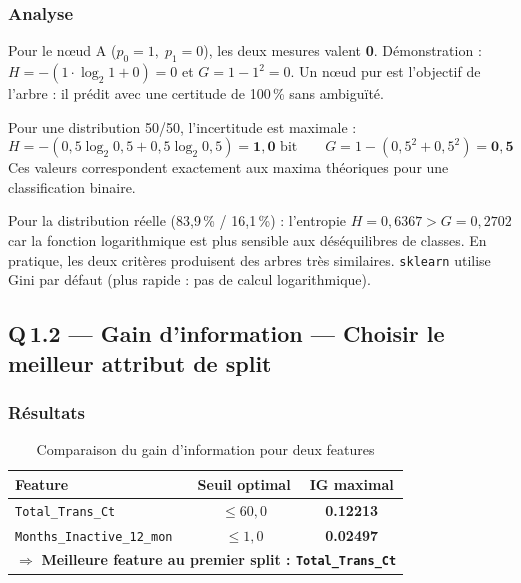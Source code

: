 \documentclass[12pt,a4paper]{article}
\newcommand{\feature}[1]{\texttt{\small #1}}
\newcommand{\score}[1]{\textbf{#1}}
\begin{document}
\subsubsection{Analyse}

\begin{reponsebox}
Pour le nœud A ($p_0=1,\;p_1=0$), les deux mesures valent \textbf{0}.
Démonstration : $H = -(1\cdot\log_2 1 + 0) = 0$ et $G = 1 - 1^2 = 0$.
Un nœud pur est l'objectif de l'arbre : il prédit avec une certitude de 100\,\% sans ambiguïté.
\end{reponsebox}

\begin{reponsebox}
Pour une distribution 50/50, l'incertitude est maximale :
\[
  H = -(0{,}5\log_2 0{,}5 + 0{,}5\log_2 0{,}5) = \mathbf{1{,}0} \text{ bit}
  \qquad
  G = 1 - (0{,}5^2 + 0{,}5^2) = \mathbf{0{,}5}
\]
Ces valeurs correspondent exactement aux maxima théoriques pour une classification binaire.
\end{reponsebox}

\begin{reponsebox}
Pour la distribution réelle (83,9\,\% / 16,1\,\%) :
l'entropie $H = 0{,}6367 > G = 0{,}2702$ car la fonction logarithmique est plus sensible
aux déséquilibres de classes. En pratique, les deux critères produisent des arbres très similaires.
\texttt{sklearn} utilise Gini par défaut (plus rapide : pas de calcul logarithmique).
\end{reponsebox}

\subsection{Q\,1.2 — Gain d'information — Choisir le meilleur attribut de split}

\subsubsection{Résultats}

\begin{table}[H]
\centering
\caption{Comparaison du gain d'information pour deux features}
\begin{tabular}{lcc}
\toprule
\textbf{Feature} & \textbf{Seuil optimal} & \textbf{IG maximal} \\
\midrule
\feature{Total\_Trans\_Ct}         & $\leq 60{,}0$ & \score{0.12213} \\
\rowcolor{rowalt}
\feature{Months\_Inactive\_12\_mon} & $\leq 1{,}0$  & \score{0.02497} \\
\bottomrule
\multicolumn{3}{l}{\small $\Rightarrow$ \textbf{Meilleure feature au premier split : \feature{Total\_Trans\_Ct}}} \\
\end{tabular}
\end{table}
\end{document}
